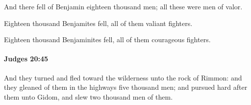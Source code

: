 			\begin{versebox}
					\item[BHS] 
					\item[ASV] And there fell of Benjamin eighteen thousand men; all these were men of valor.
					\item[NIV] Eighteen thousand Benjamites fell, all of them valiant fighters.
					\item[NRSV] Eighteen thousand Benjaminites fell, all of them courageous fighters.
			\end{versebox}

		\paragraph{Judges 20:45} %
			\label{JUDGES-20-45}

			And they turned and fled toward the wilderness unto the rock of Rimmon: and they gleaned of them in the highways five thousand men; and pursued hard after them unto Gidom, and slew two thousand men of them.

